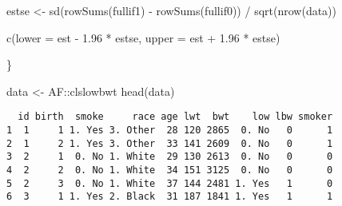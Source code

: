 \documentclass[
  letterpaper,
  DIV=11,
  numbers=noendperiod]{scrartcl}
\newenvironment{Shaded}{\begin{snugshade}}{\end{snugshade}}
\newcommand{\AttributeTok}[1]{\textcolor[rgb]{0.40,0.45,0.13}{#1}}
\newcommand{\FloatTok}[1]{\textcolor[rgb]{0.68,0.00,0.00}{#1}}
\newcommand{\FunctionTok}[1]{\textcolor[rgb]{0.28,0.35,0.67}{#1}}
\newcommand{\NormalTok}[1]{\textcolor[rgb]{0.00,0.23,0.31}{#1}}
\newcommand{\OtherTok}[1]{\textcolor[rgb]{0.00,0.23,0.31}{#1}}
\newcommand{\SpecialCharTok}[1]{\textcolor[rgb]{0.37,0.37,0.37}{#1}}
\begin{document}
\begin{Shaded}
\begin{Highlighting}[]
  
\NormalTok{  estse }\OtherTok{\textless{}{-}} \FunctionTok{sd}\NormalTok{(}\FunctionTok{rowSums}\NormalTok{(fullif1) }\SpecialCharTok{{-}} \FunctionTok{rowSums}\NormalTok{(fullif0)) }\SpecialCharTok{/} \FunctionTok{sqrt}\NormalTok{(}\FunctionTok{nrow}\NormalTok{(data))}
  
  \FunctionTok{c}\NormalTok{(}\AttributeTok{lower =}\NormalTok{ est }\SpecialCharTok{{-}} \FloatTok{1.96} \SpecialCharTok{*}\NormalTok{ estse, }\AttributeTok{upper =}\NormalTok{ est }\SpecialCharTok{+} \FloatTok{1.96} \SpecialCharTok{*}\NormalTok{ estse)}
  
  
\NormalTok{\}}

\NormalTok{data }\OtherTok{\textless{}{-}}\NormalTok{ AF}\SpecialCharTok{::}\NormalTok{clslowbwt}
\FunctionTok{head}\NormalTok{(data)}
\end{Highlighting}
\end{Shaded}

\begin{verbatim}
  id birth  smoke     race age lwt  bwt    low lbw smoker
1  1     1 1. Yes 3. Other  28 120 2865  0. No   0      1
2  1     2 1. Yes 3. Other  33 141 2609  0. No   0      1
3  2     1  0. No 1. White  29 130 2613  0. No   0      0
4  2     2  0. No 1. White  34 151 3125  0. No   0      0
5  2     3  0. No 1. White  37 144 2481 1. Yes   1      0
6  3     1 1. Yes 2. Black  31 187 1841 1. Yes   1      1
\end{verbatim}
\end{document}
